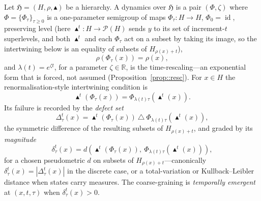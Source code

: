 \documentclass[runningheads]{llncs}
\newcommand{\R}{\mathbb{R}}
\begin{document}
\begin{definition}\label{def::dyn}
Let $\mathfrak H=(H,\rho,\blacktriangle)$ be a hierarchy. A dynamics over $\mathfrak H$ is a pair $(\Phi,\zeta)$ where $\Phi=\{\Phi_\tau\}_{\tau\geq0}$ is a one-parameter semigroup of maps $\Phi_\tau:H\to H$, $\Phi_0=\operatorname{id}$, preserving level (here $\blacktriangle^t:H\to\mathcal P(H)$ sends $y$ to its set of increment-$t$ superlevels, and both $\blacktriangle^t$ and each $\Phi_\tau$ act on a subset by taking its image, so the intertwining below is an equality of subsets of $H_{\rho(x)+t}$),
\[
\rho(\Phi_\tau(x))=\rho(x),
\]
and $\lambda(t)=e^{\zeta t}$, for a parameter $\zeta\in\R$, is the time-rescaling---an exponential form that is forced, not assumed (Proposition~\ref{prop::resc}). For $x\in H$ the renormalisation-style intertwining condition is
\[
\blacktriangle^t(\Phi_\tau(x))=\Phi_{\lambda(t)\tau}(\blacktriangle^t(x)).
\]
Its failure is recorded by the \emph{defect set}
\[
\Delta^t_\tau(x)=\blacktriangle^t(\Phi_\tau(x))\ \triangle\ \Phi_{\lambda(t)\tau}(\blacktriangle^t(x)),
\]
the symmetric difference of the resulting subsets of $H_{\rho(x)+t}$, and graded by its \emph{magnitude}
\[
\delta^t_\tau(x)=d\!\left(\blacktriangle^t(\Phi_\tau(x)),\ \Phi_{\lambda(t)\tau}(\blacktriangle^t(x))\right),
\]
for a chosen pseudometric $d$ on subsets of $H_{\rho(x)+t}$---canonically $\delta^t_\tau(x)=|\Delta^t_\tau(x)|$ in the discrete case, or a total-variation or Kullback--Leibler distance when states carry measures. The coarse-graining is \emph{temporally emergent} at $(x,t,\tau)$ when $\delta^t_\tau(x)>0$.
\end{definition}
\end{document}
